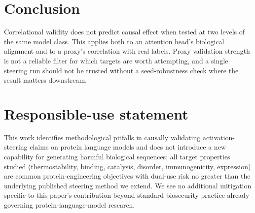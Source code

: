 \documentclass{article}
\begin{document}
\section{Conclusion}

Correlational validity does not predict causal effect when tested at two
levels of the same model class. This applies both to an attention head's
biological alignment and to a proxy's correlation with real labels. Proxy
validation strength is not a reliable filter for which targets are worth
attempting, and a single steering run should not be trusted without a
seed-robustness check where the result matters downstream.

\section*{Responsible-use statement}
This work identifies methodological pitfalls in causally validating
activation-steering claims on protein language models and does not
introduce a new capability for generating harmful biological sequences;
all target properties studied (thermostability, binding, catalysis,
disorder, immunogenicity, expression) are common protein-engineering
objectives with dual-use risk no greater than the underlying published
steering method \citep{huang2025steering} we extend. We see no additional
mitigation specific to this paper's contribution beyond standard
biosecurity practice already governing protein-language-model research.



\end{document}
